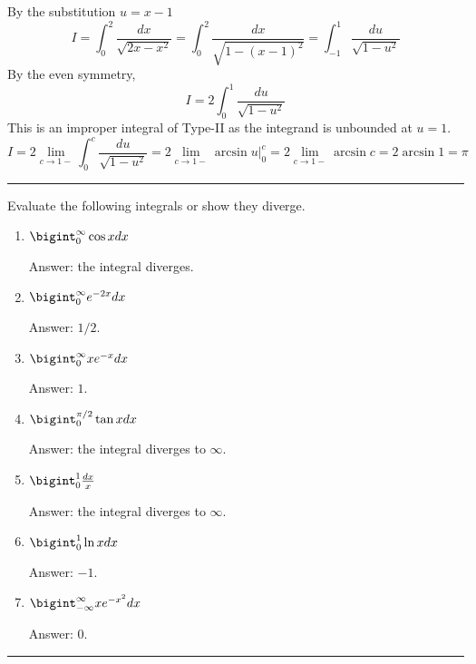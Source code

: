 \documentclass[../calc1-main.tex]{subfiles}
\begin{document}
\begin{minipage}{0.5\textwidth}
\begin{solution}
By the substitution $u = x-1$
\[
	I = \int_0^2 \frac{dx}{\sqrt{2x-x^2}} = 
	\int_0^2 \frac{dx}{\sqrt{1-(x-1)^2}} =
	\int_{-1}^1 \frac{du}{\sqrt{1-u^2}}
\]
By the even symmetry,
\[
	I = 2\int_0^1 \frac{du}{\sqrt{1-u^2}}
\]
This is an improper integral of Type-II as the integrand is unbounded at $u=1$.
\[
	I = 2 \lim_{c \to 1-} \int_0^c \frac{du}{\sqrt{1-u^2}} =
	2 \lim_{c \to 1-} \left. \arcsin u \right \vert_0^c =
	2 \lim_{c \to 1-} \arcsin c = 2 \arcsin 1 = \pi
\]
\end{solution}
\end{minipage}%
\begin{minipage}{0.5\textwidth}
  \begin{figure}[H]
  	\centering
  \end{figure}
\end{minipage}



\rule{\textwidth}{1pt}
\begin{multicols}{2}
\begin{exercise}
Evaluate the following integrals or show they diverge.
	\begin{enumerate}
		\item $\bigint_0^{\infty} \cos x dx$

		Answer: the integral diverges.
		\item $\bigint_0^{\infty} e^{-2x} dx$

		Answer: $1/2$.
		\item $\bigint_0^{\infty} x e^{-x} dx$

		Answer: $1$.
		\item $\bigint_0^{\pi/2} \tan x dx$

		Answer: the integral diverges to $\infty$.
		\item $\bigint_0^1 \frac{dx}{x}$

		Answer: the integral diverges to $\infty$.
		\item $\bigint_0^1 \ln x dx$

		Answer: $-1$.

		\item $\bigint_{-\infty}^{\infty} x e^{-x^2} dx$

		Answer: $0$.
	\end{enumerate}
\end{exercise}
\end{multicols}
\rule{\textwidth}{1pt}
\end{document}
